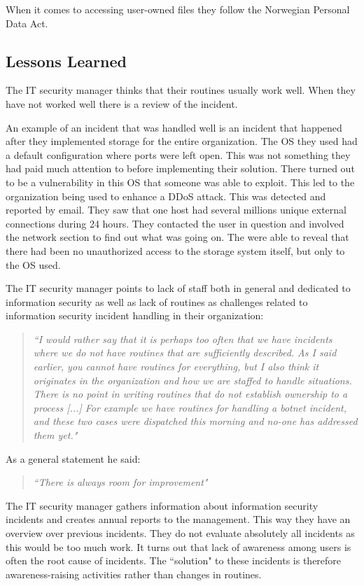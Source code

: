 When it comes to accessing user-owned files they follow the Norwegian Personal Data Act.

\subsection{Lessons Learned}
The IT security manager thinks that their routines usually work well. When they have not worked well there is a review of the incident.

An example of an incident that was handled well is an incident that happened after they implemented storage for the entire organization. The OS they used had a default configuration where ports were left open. This was not something they had paid much attention to before implementing their solution. There turned out to be a vulnerability in this OS that someone was able to exploit. This led to the organization being used to enhance a \ac{DDoS} attack. This was detected and reported by email. They saw that one host had several millions unique external connections during 24 hours. They contacted the user in question  and involved the network section to find out what was going on. The were able to reveal that there had been no unauthorized access to the storage system itself, but only to the OS used.

The IT security manager points to lack of staff  both in general and dedicated to information security as well as lack of routines as challenges related to information security incident handling in their organization: 

\begin{quote}
\textit{``I would rather say that it is perhaps too often that we have incidents where we do not have routines that are sufficiently described. %
As I said earlier, you cannot have routines for everything, but I also think it originates in the organization and how we are staffed to handle situations. There is no point in writing routines that do not establish ownership to a process [...] For example we have routines for handling a botnet incident, and these two cases were dispatched this morning and no-one has addressed them yet."}
\end{quote}

As a general statement he said: 

\begin{quote}
\textit{``There is always room for improvement"}
\end{quote}

The IT security manager gathers information about information security incidents and creates annual reports to the management. This way they have an overview over previous incidents. They do not evaluate absolutely all incidents as this would be too much work. It turns out that lack of awareness among users is often the root cause of incidents. The ``solution" to these incidents is therefore awareness-raising activities rather than changes in routines.

